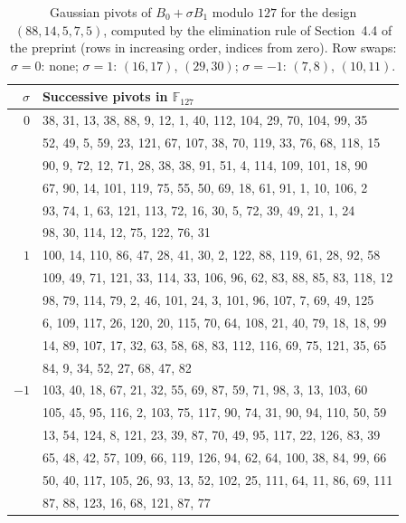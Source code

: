 \begin{table}[ht]
\centering
\small
\begin{tabular}{rl}
\hline
$\sigma$ & Successive pivots in $\mathbb{F}_{127}$ \\
\hline
$0$ & 38, 31, 13, 38, 88, 9, 12, 1, 40, 112, 104, 29, 70, 104, 99, 35 \\
 & 52, 49, 5, 59, 23, 121, 67, 107, 38, 70, 119, 33, 76, 68, 118, 15 \\
 & 90, 9, 72, 12, 71, 28, 38, 38, 91, 51, 4, 114, 109, 101, 18, 90 \\
 & 67, 90, 14, 101, 119, 75, 55, 50, 69, 18, 61, 91, 1, 10, 106, 2 \\
 & 93, 74, 1, 63, 121, 113, 72, 16, 30, 5, 72, 39, 49, 21, 1, 24 \\
 & 98, 30, 114, 12, 75, 122, 76, 31 \\
\hline
$1$ & 100, 14, 110, 86, 47, 28, 41, 30, 2, 122, 88, 119, 61, 28, 92, 58 \\
 & 109, 49, 71, 121, 33, 114, 33, 106, 96, 62, 83, 88, 85, 83, 118, 12 \\
 & 98, 79, 114, 79, 2, 46, 101, 24, 3, 101, 96, 107, 7, 69, 49, 125 \\
 & 6, 109, 117, 26, 120, 20, 115, 70, 64, 108, 21, 40, 79, 18, 18, 99 \\
 & 14, 89, 107, 17, 32, 63, 58, 68, 83, 112, 116, 69, 75, 121, 35, 65 \\
 & 84, 9, 34, 52, 27, 68, 47, 82 \\
\hline
$-1$ & 103, 40, 18, 67, 21, 32, 55, 69, 87, 59, 71, 98, 3, 13, 103, 60 \\
 & 105, 45, 95, 116, 2, 103, 75, 117, 90, 74, 31, 90, 94, 110, 50, 59 \\
 & 13, 54, 124, 8, 121, 23, 39, 87, 70, 49, 95, 117, 22, 126, 83, 39 \\
 & 65, 48, 42, 57, 109, 66, 119, 126, 94, 62, 64, 100, 38, 84, 99, 66 \\
 & 50, 40, 117, 105, 26, 93, 13, 52, 102, 25, 111, 64, 11, 86, 69, 111 \\
 & 87, 88, 123, 16, 68, 121, 87, 77 \\
\hline
\end{tabular}
\caption{Gaussian pivots of $B_0+\sigma B_1$ modulo $127$ for the design $(88,14,5,7,5)$, computed by the elimination rule of Section~4.4 of the preprint (rows in increasing order, indices from zero). Row swaps: $\sigma=0$: none; $\sigma=1$: $(16,17)$, $(29,30)$; $\sigma=-1$: $(7,8)$, $(10,11)$.}
\label{tab:pivots127}
\end{table}
